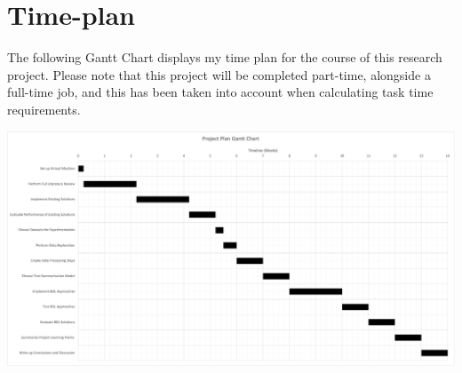 \documentclass[ %
                    author={James Stephenson},
                supervisor={Dr. Edwin Simpson},
                    degree={MSc},
                     title={PROJECT PLAN},
                  subtitle={Bayesian Deep Learning For Extractive Test Summarisation},
                      type={},
                      year={2022}]{../additions/dissertation}
\begin{document}
	
	
	
	\backmatter
	
	
	
	
	
	\appendix
	
	\chapter{Time-plan}
		\label{appx:timeplan}
		
		The following Gantt Chart displays my time plan for the course of this research project. Please note that this project will be completed part-time, alongside a full-time job, and this has been taken into account when calculating task time requirements.
		\bigbreak
		
		\begin{center}
			\includegraphics[width=\textwidth,height=\textheight,keepaspectratio]{Gantt.png}
		\end{center}
		
\end{document}
